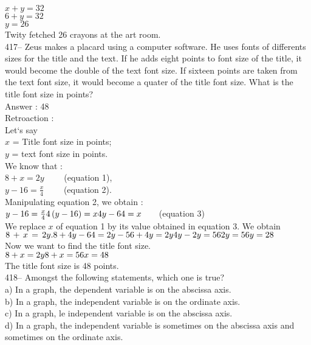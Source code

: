 ﻿\documentclass[letterpaper, 12pt]{article}
\begin{document}
$x+y=32$\\
$6+y=32$\\
$y=26$\\

Twity fetched 26 crayons at the art room.\\

417-- Zeus makes a placard using a computer software. He uses fonts of differents sizes for the title and the text.
  If he adds eight points to font size of the title, it would become the double of the text font size. If sixteen points are taken from the text font size, it would become a quater of the title font size. What is the title font size in points?\\

Answer : 48\\

Retroaction : \\
Let`s say\\
$x$ = Title font size in points;\\
$y$ = text font size in points.\\

We know that : \\
$8+x=2y \qquad $ (equation 1),\\
$y-16=\frac{x}{4} \qquad$ (equation 2).\\

Manipulating equation 2, we obtain :\\
$y-16=\frac{x}{4}\\
4\left( y-16\right) =x\\
4y-64=x \qquad $(equation 3)\\

We replace $x$ of equation 1 by its value obtained in equation 3.
We obtain $8\,+\,x\,=\,2y.\\
8+4y-64=2y\\
-56+4y=2y\\
4y-2y=56\\
2y=56\\
y=28$\\

Now we want to find the title font size.\\
$8+x=2y\\
8+x=56\\
x=48$\\

The title font size is 48 points.\\


418-- Amongst the following statements, which one is true?\\
a) In a graph, the dependent variable is on the abscissa axis.\\
b) In a graph, the independent variable is on the ordinate axis.\\
c) In a graph, le independent variable is on the abscissa axis.\\
d) In a graph, the independent variable is sometimes on the abscissa axis and sometimes on the ordinate axis.\\
\end{document}
